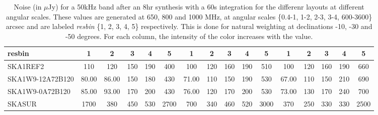 \begin{table}[!htp]
{{\begin{tabular}{|lccccc||ccccc||ccccc|}
 resbin  &1 & 2 & 3 & 4 & 5 & 1 & 2 & 3 & 4 & 5 & 1 & 2 & 3 & 4 & 5 \tabularnewline \hline
SKA1REF2 & 110 \cellcolor{blue!18.78} & 120 \cellcolor{red!22.86} & 150 \cellcolor{green!18.00} & 190 \cellcolor{orange!19.20} & 400 \cellcolor{purple!18.00} & 100 \cellcolor{blue!19.94} & 120 \cellcolor{red!19.83} & 160 \cellcolor{green!19.35} & 190 \cellcolor{orange!18.00} & 510 \cellcolor{purple!18.00} & 100 \cellcolor{blue!22.57} & 120 \cellcolor{red!21.00} & 160 \cellcolor{green!20.33} & 190 \cellcolor{orange!18.00} & 660 \cellcolor{purple!18.00}\\ \hline 
SKA1W9-12A72B120 & 80.00 \cellcolor{blue!18.00} & 86.00 \cellcolor{red!18.00} & 150 \cellcolor{green!18.00} & 180 \cellcolor{orange!18.00} & 430 \cellcolor{purple!18.55} & 71.00 \cellcolor{blue!18.00} & 110 \cellcolor{red!18.00} & 150 \cellcolor{green!18.00} & 190 \cellcolor{orange!18.00} & 530 \cellcolor{purple!18.34} & 67.00 \cellcolor{blue!18.00} & 110 \cellcolor{red!18.00} & 150 \cellcolor{green!18.00} & 210 \cellcolor{orange!24.00} & 690 \cellcolor{purple!18.68}\\ \hline 
SKA1W9-0A72B120 & 85.00 \cellcolor{blue!18.13} & 93.00 \cellcolor{red!19.00} & 170 \cellcolor{green!20.80} & 200 \cellcolor{orange!20.40} & 430 \cellcolor{purple!18.55} & 76.00 \cellcolor{blue!18.33} & 120 \cellcolor{red!19.83} & 170 \cellcolor{green!20.71} & 200 \cellcolor{orange!19.27} & 530 \cellcolor{purple!18.34} & 73.00 \cellcolor{blue!18.83} & 130 \cellcolor{red!24.00} & 170 \cellcolor{green!22.67} & 240 \cellcolor{orange!33.00} & 700 \cellcolor{purple!18.91}\\ \hline 
SKASUR & 1700 \cellcolor{blue!60.00} & 380 \cellcolor{red!60.00} & 450 \cellcolor{green!60.00} & 530 \cellcolor{orange!60.00} & 2700 \cellcolor{purple!60.00} & 700 \cellcolor{blue!60.00} & 340 \cellcolor{red!60.00} & 460 \cellcolor{green!60.00} & 520 \cellcolor{orange!60.00} & 3000 \cellcolor{purple!60.00} & 370 \cellcolor{blue!60.00} & 250 \cellcolor{red!60.00} & 330 \cellcolor{green!60.00} & 330 \cellcolor{orange!60.00} & 2500 \cellcolor{purple!60.00}\tabularnewline \hline 
\end{tabular}}\hfil 

\caption{Noise (in $\mu$Jy) for a 50kHz band after an 8hr synthesis with a 60s integration for the differenr layouts at different angular scales. These values are generated at 650, 800 and 1000 MHz, at angular scales \{0.4-1, 1-2, 2-3, 3-4, 600-3600\} arcsec and are labeled {\it resbin} \{1, 2, 3, 4, 5\} respectively. This is done for natural weighting at declinations -10, -30 and -50 degrees. For each column, the intensity of the color increases with the value.}\label{tab:noise50k-band1}}
 \end{table}
